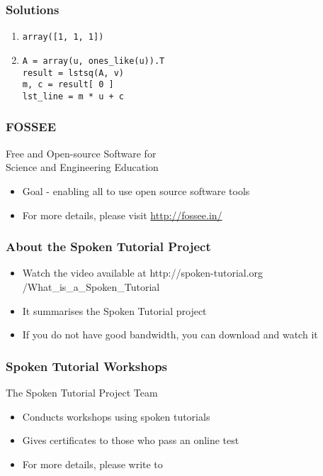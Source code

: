 \documentclass[17pt,compress]{beamer}
\begin{document}
\begin{frame}
\frametitle{Solutions}
\label{sec-7}


\begin{enumerate}
\item \texttt{array([1, 1, 1])}\pause
\vspace{15pt}
\item \texttt{A = array(u, ones\_like(u)).T}\\
     \texttt{result = lstsq(A, v)}\\
     \texttt{m, c = result[ 0 ]}\\
     \texttt{lst\_line = m * u + c}
\end{enumerate}
\end{frame}
\begin{frame}
\frametitle{FOSSEE}
{\color{blue}Free and Open-source Software for \\Science and Engineering Education} \\
\begin{itemize}
\item Goal - enabling all to use open source software tools
\item For more details, please visit {\color{blue}\url{http://fossee.in/}}
\end{itemize}
\end{frame}
\begin{frame}
\frametitle{About the Spoken Tutorial Project}
\begin{itemize}
\item Watch the video available at {\color{blue}http://spoken-tutorial.org /What\_is\_a\_Spoken\_Tutorial}
\item It summarises the Spoken Tutorial project \pause
\item If you do not have good bandwidth, you can download and watch it
\end{itemize}
\end{frame}
\begin{frame}
\frametitle{Spoken Tutorial Workshops}The Spoken Tutorial Project Team 
\begin{itemize}
\item Conducts workshops using spoken tutorials 
\item Gives certificates to those who pass an online test 
\item For more details, please write to \\ 
\end{itemize}
\end{frame}
\end{document}
